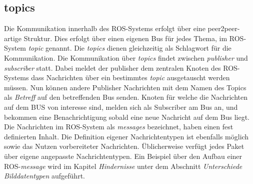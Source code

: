 		\subsection{topics}
		Die Kommunikation innerhalb des ROS-Systems erfolgt über eine peer2peer-artige Struktur. Dies erfolgt über einen eigenen Bus für jedes Thema, im ROS-System \textit{topic} genannt. Die \textit{topics} dienen gleichzeitig als Schlagwort für die Kommunikation. Die Kommunikation über \textit{topics} findet zwischen \textit{publisher} und \textit{subscriber} statt. Dabei meldet der publisher dem zentralen Knoten des ROS-Systems dass Nachrichten über ein bestimmtes \textit{topic} ausgetauscht werden müssen. Nun können andere Publisher Nachrichten mit dem Namen des Topics als \textit{Betreff} auf den betreffenden Bus senden. Knoten für welche die Nachrichten auf dem BUS von interesse sind, melden sich als Subscriber am Bus an, und bekommen eine Benachrichtigung sobald eine neue Nachricht auf dem Bus liegt. Die Nachrichten im ROS-System als \textit{messages} bezeichnet, haben einen fest definierten Inhalt. Die Definition eigener Nachrichtentypen ist ebenfalls möglich sowie das Nutzen vorbereiteter Nachrichten. Üblicherweise verfügt jedes Paket über eigene angepasste Nachrichtentypen. Ein Beispiel über den Aufbau einer ROS-\textit{message} wird im Kapitel \textit{Hindernisse} unter dem Abschnitt \textit{Unterschiede Bilddatentypen} aufgeführt.

